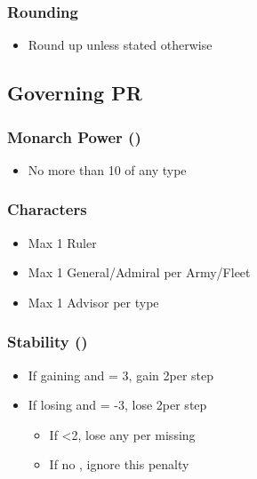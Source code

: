 \documentclass[10pt]{article}
\begin{document}
\subsubsection*{Rounding}
\begin{itemize}
	\item Round up unless stated otherwise
\end{itemize}

\subsection*{Governing PR }
\subsubsection*{Monarch Power (\monarchpower)}
\begin{itemize}
	\item No more than 10 \monarchpower of any type
\end{itemize}

\subsubsection*{Characters}
\begin{itemize}
	\item Max 1 Ruler
	\item Max 1 General/Admiral per Army/Fleet
	\item Max 1 Advisor per \monarchpower type
\end{itemize}

\subsubsection*{Stability (\stability)}
\begin{itemize}
	\item If gaining \stability and \stability = 3, gain 2\adminpower per step
	\item If losing \stability and \stability = -3, lose 2\adminpower per step
	\begin{itemize}
		\item If <2\adminpower, lose any \monarchpower per missing \adminpower
		\item If no \monarchpower, ignore this penalty
	\end{itemize}
\end{itemize}
\end{document}
